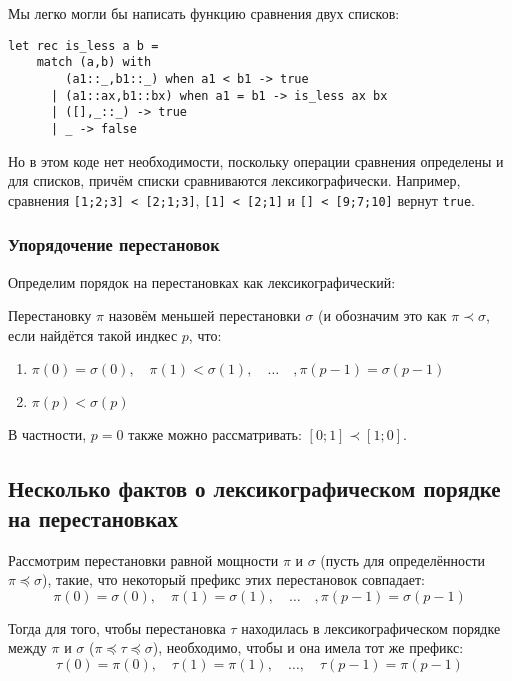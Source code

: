 \documentclass[12pt,a4paper,oneside]{article}
\begin{document}
\noindent Мы легко могли бы написать функцию сравнения двух списков:

\begin{verbatim}
let rec is_less a b =
    match (a,b) with
        (a1::_,b1::_) when a1 < b1 -> true
      | (a1::ax,b1::bx) when a1 = b1 -> is_less ax bx
      | ([],_::_) -> true
      | _ -> false
\end{verbatim}

Но в этом коде нет необходимости, поскольку операции сравнения определены
и для списков, причём списки сравниваются лексикографически.
Например, сравнения \verb![1;2;3] < [2;1;3]!, \verb![1] < [2;1]! и \verb![] < [9;7;10]! вернут \verb!true!.

\subsubsection{Упорядочение перестановок}

Определим порядок на перестановках как лексикографический:

\begin{definition}
Перестановку $\pi$ назовём меньшей перестановки $\sigma$ (и обозначим это
как $\pi\prec\sigma$, если найдётся такой индкес $p$, что:
\begin{enumerate}
\item $\pi(0) = \sigma(0),\quad\pi(1) < \sigma(1),\quad\dots\quad,\pi(p-1)=\sigma(p-1)$
\item $\pi(p) < \sigma(p)$
\end{enumerate}
\end{definition}

\noindent В частности, $p=0$ также можно рассматривать: $[0;1]\prec[1;0]$.

\subsection{Несколько фактов о лексикографическом порядке на перестановках}

\begin{lemma}\label{between}
Рассмотрим перестановки равной мощности $\pi$ и $\sigma$ (пусть для определённости $\pi\preceq\sigma$), 
такие, что некоторый префикс этих перестановок совпадает:
$$\pi(0) = \sigma(0),\quad \pi(1) =\sigma(1),\quad\dots\quad, \pi(p-1) = \sigma(p-1)$$

Тогда для того, чтобы перестановка $\tau$ находилась в лексикографическом порядке
между $\pi$ и $\sigma$ ($\pi\preceq\tau\preceq\sigma$), необходимо, чтобы и она имела
тот же префикс:
$$\tau(0) = \pi(0),\quad \tau(1) = \pi(1) ,\quad\dots,\quad \tau(p-1) = \pi(p-1)$$
\end{lemma}
\end{document}
